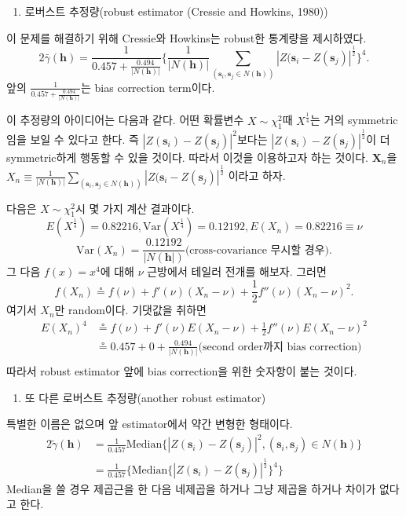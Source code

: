 \documentclass[b5paper,]{book}
\providecommand{\tightlist}{%
  \setlength{\itemsep}{0pt}\setlength{\parskip}{0pt}}
\theoremstyle{definition}
\theoremstyle{definition}
\theoremstyle{definition}
\theoremstyle{remark}
\begin{document}
\begin{enumerate}
\def\labelenumi{\arabic{enumi}.}
\setcounter{enumi}{1}
\tightlist
\item
  로버스트 추정량(robust estimator (Cressie and Howkins, 1980))
\end{enumerate}

이 문제를 해결하기 위해 Cressie와 Howkins는 robust한 통계량을
제시하였다.
\[2 \bar{\gamma}(\mathbf{h})=\frac{1}{0.457+\frac{0.494}{|N(\mathbf{h})|}}\{\frac{1}{|N(\mathbf{h})|}\sum_{(\mathbf{s}_{i},\mathbf{s}_{j} \in N(\mathbf{h}))} |Z(\mathbf{s}_{i}-Z(\mathbf{s}_{j})|^{\frac{1}{2}}\}^{4}.\]
앞의 \(\frac{1}{0.457+\frac{0.494}{|N(\mathbf{h})|}}\)는 bias correction
term이다.

이 추정량의 아이디어는 다음과 같다. 어떤 확률변수
\(X \sim \chi_{1}^{2}\)때 \(X^{\frac{1}{4}}\)는 거의 symmetric임을 보일
수 있다고 한다. 즉 \(|Z(\mathbf{s}_{i})-Z(\mathbf{s}_{j})|^{2}\)보다는
\(|Z(\mathbf{s}_{i})-Z(\mathbf{s}_{j})|^{\frac{1}{2}}\)이 더
symmetric하게 행동할 수 있을 것이다. 따라서 이것을 이용하고자 하는
것이다. \(\mathbf{X}_{n}\)을
\(X_{n}\equiv\frac{1}{|N(\mathbf{h})|}\sum_{(\mathbf{s}_{i},\mathbf{s}_{j} \in N(\mathbf{h}))} |Z(\mathbf{s}_{i}-Z(\mathbf{s}_{j})|^{\frac{1}{2}}\)
이라고 하자.

다음은 \(X \sim \chi_{1}^{2}\)시 몇 가지 계산 결과이다.
\[E(X^{\frac{1}{4}})=0.82216, \text{Var}(X^{\frac{1}{4}})=0.12192, E(X_{n})=0.82216 \equiv \nu\]
\[\text{Var}(X_{n})=\frac{0.12192}{|N(\mathbf{h}|)} \text{(cross-covariance 무시할 경우)} .\]
그 다음 \(f(x)=x^{4}\)에 대해 \(\nu\) 근방에서 테일러 전개를 해보자.
그러면
\[f(X_{n})\circeq f(\nu) +f'(\nu)(X_{n}-\nu)+\frac{1}{2}f''(\nu)(X_{n}-\nu)^{2} .\]
여기서 \(X_{n}\)만 random이다. 기댓값을 취하면 \[
\begin{aligned}
E(X_{n})^{4}&\circeq f(\nu) + f'(\nu)E(X_{n}-\nu) +\frac{1}{2}f''(\nu)E(X_{n}-\nu)^{2}\\
&\circeq 0.457 + 0 +\frac{0.494}{|N(\mathbf{h})|} \text{(second order까지 bias correction)}\\
\end{aligned}
\] 따라서 robust estimator 앞에 bias correction을 위한 숫자항이 붙는
것이다.

\begin{enumerate}
\def\labelenumi{\arabic{enumi}.}
\setcounter{enumi}{2}
\tightlist
\item
  또 다른 로버스트 추정량(another robust estimator)
\end{enumerate}

특별한 이름은 없으며 앞 estimator에서 약간 변형한 형태이다. \[
\begin{aligned}
2\tilde{\gamma}(\mathbf{h})&=\frac{1}{0.457}\text{Median}\{ |Z(\mathbf{s}_{i})-Z(\mathbf{s}_{j})|^{2} , (\mathbf{s}_{i},\mathbf{s}_{j})\in N(\mathbf{h}) \}\\
&=\frac{1}{0.457}\{\text{Median} \{ |Z(\mathbf{s}_{i})-Z(\mathbf{s}_{j})|^{\frac{1}{2}} \}^{4} \}
\end{aligned}
\] Median을 쓸 경우 제곱근을 한 다음 네제곱을 하거나 그냥 제곱을 하거나
차이가 없다고 한다.
\end{document}
